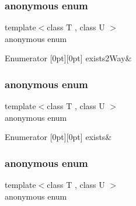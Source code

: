 \subsubsection{\texorpdfstring{anonymous enum}{anonymous enum}}
{\footnotesize\ttfamily template$<$class T , class U $>$ \\
anonymous enum}

\begin{DoxyEnumFields}{Enumerator}
[0pt][0pt]{}\mbox{\label{structUtil_1_1Conversion_aaa3b3e4fee0a3d87951a2e788aaa14aba57b873c1826056eca5f6fb7d56ccb11f}} 
exists2\+Way&\\
\hline

\end{DoxyEnumFields}
\mbox{\label{structUtil_1_1Conversion_a85e1e7e32a81ebadbb1f987994283ab7}} 
\subsubsection{\texorpdfstring{anonymous enum}{anonymous enum}}
{\footnotesize\ttfamily template$<$class T , class U $>$ \\
anonymous enum}

\begin{DoxyEnumFields}{Enumerator}
[0pt][0pt]{}\mbox{\label{structUtil_1_1Conversion_a85e1e7e32a81ebadbb1f987994283ab7a66cec7f52af17b9d2055795f332f3435}} 
exists&\\
\hline

\end{DoxyEnumFields}
\mbox{\label{structUtil_1_1Conversion_aaa3b3e4fee0a3d87951a2e788aaa14ab}} 
\subsubsection{\texorpdfstring{anonymous enum}{anonymous enum}}
{\footnotesize\ttfamily template$<$class T , class U $>$ \\
anonymous enum}

